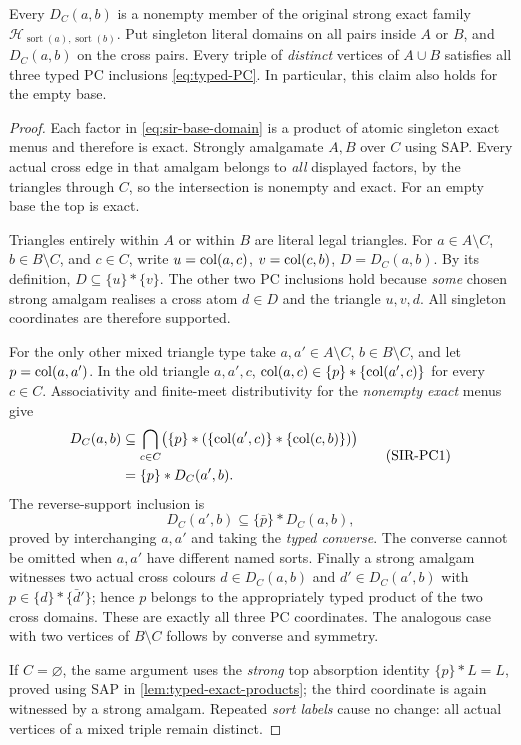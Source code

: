 \begin{lemma}
\label{lem:sir-free-span-PC}
Every \(D_C(a,b)\) is a nonempty member of the
original strong exact family
\(\mathcal H_{\operatorname{sort}(a),\operatorname{sort}(b)}\).
Put singleton literal domains on all pairs
inside \(A\) or \(B\), and \(D_C(a,b)\)
on the cross pairs. Every triple of
\emph{distinct} vertices of \(A\cup B\)
satisfies all three typed PC inclusions
\eqref{eq:typed-PC}. In particular, this
claim also holds for the empty base.
\end{lemma}
\begin{proof}
Each factor in \eqref{eq:sir-base-domain}
is a product of atomic singleton exact
menus and therefore is exact. Strongly
amalgamate \(A,B\) over \(C\) using SAP.
Every actual cross edge in that amalgam
belongs to \emph{all} displayed factors,
by the triangles through \(C\), so the
intersection is nonempty and exact.
For an empty base the top is exact.

Triangles entirely within \(A\) or
within \(B\) are literal legal triangles.
For \(a\in A\setminus C\),
\(b\in B\setminus C\), and
\(c\in C\), write
\(u=\operatorname{col}(a,c)\), \(v=\operatorname{col}(c,b)\),
\(D=D_C(a,b)\). By its definition,
\(D\subseteq\{u\}*\{v\}\).
The other two PC inclusions hold because
\emph{some} chosen strong amalgam
realises a cross atom \(d\in D\)
and the triangle \(u,v,d\).
All singleton coordinates are
therefore supported.

For the only other mixed triangle
type take \(a,a'\in A\setminus C\),
\(b\in B\setminus C\), and let
\(p=\operatorname{col}(a,a')\).
In the old triangle \(a,a',c\),
\(\operatorname{col}(a,c)\in\{p\}*\{\operatorname{col}(a',c)\}\)
for every \(c\in C\).
Associativity and finite-meet
distributivity for the
\emph{nonempty exact} menus give
\[
\begin{split}
 D_C(a,b)
 &\subseteq
 \bigcap_{c\in C}
 \bigl(\{p\}*
       (\{\operatorname{col}(a',c)\}*\{\operatorname{col}(c,b)\})\bigr)\\
 &=\{p\}*D_C(a',b).
\end{split}
 \tag{SIR-PC1}\label{eq:sir-PC-first}
\]
The reverse-support inclusion is
\[
   D_C(a',b)\subseteq\{\bar p\}*D_C(a,b),
\]
proved by interchanging \(a,a'\) and
taking the \emph{typed converse}.
The converse cannot be omitted
when \(a,a'\) have different
named sorts.
Finally a strong amalgam witnesses
two actual cross colours
\(d\in D_C(a,b)\) and
\(d'\in D_C(a',b)\) with
\(p\in\{d\}*\{\bar d'\}\);
hence \(p\) belongs to the
appropriately typed product of
the two cross domains. These
are exactly all three PC
coordinates. The analogous case
with two vertices of \(B\setminus C\)
follows by converse and symmetry.

If \(C=\varnothing\), the same
argument uses the \emph{strong}
top absorption identity
\(\{p\}*L=L\), proved using SAP
in \cref{lem:typed-exact-products};
the third coordinate is again
witnessed by a strong amalgam.
Repeated \emph{sort labels} cause
no change: all actual vertices of
a mixed triple remain distinct.
\end{proof}

